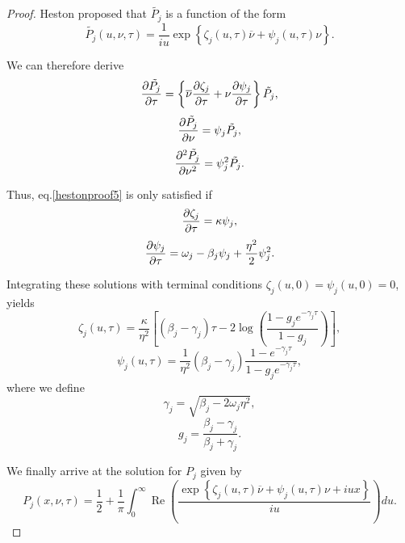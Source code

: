 \begin{proof}
Heston proposed that $\tilde{P_j}$ is a function of the form
\begin{equation}
\tilde{P_j}(u,\nu,\tau)=\frac{1}{iu}\exp\left\{\zeta_j(u,\tau)\overline{\nu}+\psi_j(u,\tau)\nu\right\}.
\end{equation}

We can therefore derive
\begin{equation}
\pdv{\tilde{P_j}}{\tau}=\left\{\overline{\nu}\pdv{\zeta_j}{\tau}+\nu\pdv{\psi_j}{\tau}\right\}\tilde{P_j},
\end{equation}
\begin{equation}
\pdv{\tilde{P_j}}{\nu}=\psi_j\tilde{P_j},
\end{equation}
\begin{equation}
\pdv[2]{\tilde{P_j}}{\nu}=\psi_j^2\tilde{P_j}.
\end{equation}

Thus, eq.\eqref{hestonproof5} is only satisfied if
\begin{equation}
\pdv{\zeta_j}{\tau}=\kappa\psi_j,
\end{equation}
\begin{equation}
\pdv{\psi_j}{\tau}=\omega_j-\beta_j\psi_j+\frac{\eta^2}{2}\psi_j^2.
\end{equation}

Integrating these solutions with terminal conditions $\zeta_j(u,0)=\psi_j(u,0)=0$, yields
\begin{equation}
\zeta_j(u,\tau)=\frac{\kappa}{\eta^2}\left[\left(\beta_j-\gamma_j\right)\tau-2\log\left(\frac{1-g_je^{-\gamma_j \tau}}{1-g_j}\right)\right],
\end{equation}
\begin{equation}
\psi_j(u,\tau)=\frac{1}{\eta^2}\left(\beta_j-\gamma_j\right)\frac{1-e^{-\gamma_j \tau}}{1-g_je^{-\gamma_j \tau}},
\end{equation}
\noindent where we define
\begin{equation}
\gamma_j=\sqrt{\beta_j-2\omega_j\eta^2},
\end{equation}
\begin{equation}
g_j=\frac{\beta_j-\gamma_j}{\beta_j+\gamma_j}.
\end{equation}

We finally arrive at the solution for $P_j$ given by
\begin{equation}
P_j(x,\nu,\tau)=\frac{1}{2}+\frac{1}{\pi}\int_0^\infty\operatorname{Re}\left(\frac{\exp\left\{\zeta_j(u,\tau)\overline{\nu}+\psi_j(u,\tau)\nu+iux\right\}}{iu}\right)du.
\end{equation}


\end{proof}
